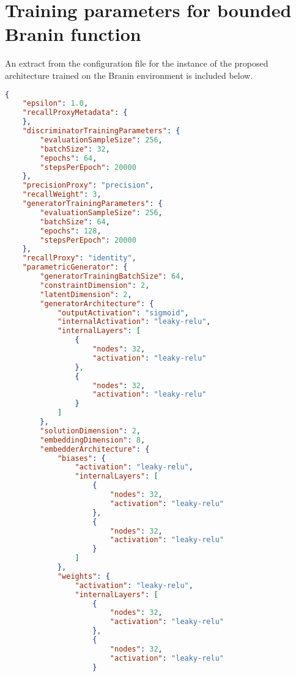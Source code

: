 \documentclass[../main.tex]{subfiles}
\begin{document}
\section{Training parameters for bounded Branin function} \label{appendix:braninTrainingParameters}

An extract from the configuration file for the instance of the proposed architecture trained on the Branin environment is included below.

\begin{lstlisting}[language=json,firstnumber=1,caption={Experimental parameters for training a generator on the bounded Branin function environment.},captionpos=b]
{  
    "epsilon": 1.0,
    "recallProxyMetadata": {
    },
    "discriminatorTrainingParameters": {  
        "evaluationSampleSize": 256,
        "batchSize": 32,
        "epochs": 64,
        "stepsPerEpoch": 20000
    },
    "precisionProxy": "precision",
    "recallWeight": 3,
    "generatorTrainingParameters": {  
        "evaluationSampleSize": 256,
        "batchSize": 64,
        "epochs": 128,
        "stepsPerEpoch": 20000
    },
    "recallProxy": "identity",
    "parametricGenerator": {  
        "generatorTrainingBatchSize": 64,
        "constraintDimension": 2,
        "latentDimension": 2,
        "generatorArchitecture": {  
            "outputActivation": "sigmoid",
            "internalActivation": "leaky-relu",
            "internalLayers": [  
                {  
                    "nodes": 32,
                    "activation": "leaky-relu"
                },
                {  
                    "nodes": 32,
                    "activation": "leaky-relu"
                }
            ]
        },
        "solutionDimension": 2,
        "embeddingDimension": 8,
        "embedderArchitecture": {  
            "biases": {  
                "activation": "leaky-relu",
                "internalLayers": [  
                    {  
                        "nodes": 32,
                        "activation": "leaky-relu"
                    },
                    {  
                        "nodes": 32,
                        "activation": "leaky-relu"
                    }
                ]
            },
            "weights": {  
                "activation": "leaky-relu",
                "internalLayers": [  
                    {  
                        "nodes": 32,
                        "activation": "leaky-relu"
                    },
                    {  
                        "nodes": 32,
                        "activation": "leaky-relu"
                    }

\end{lstlisting}
\end{document}
